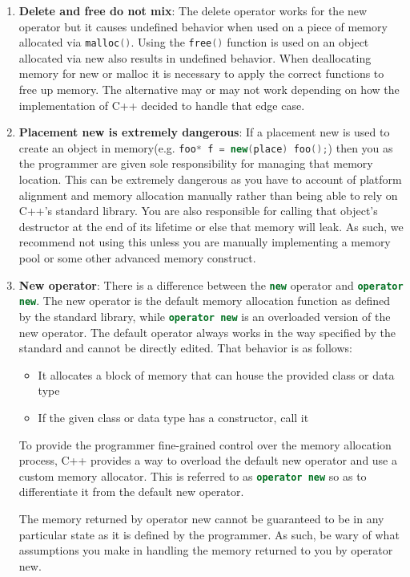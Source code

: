 \documentclass[letterpaper, 11pt]{article}
\newcommand{\inlinecode}[1]{\colorbox{codegrey}{\lstinline[language=C++]{#1}}}
\begin{document}
\begin{enumerate}
  \item {\bfseries Delete and free do not mix}:
  The delete operator works for the new operator but it causes undefined behavior when used 
  on a piece of memory allocated via \inlinecode{malloc()}. Using the \inlinecode{free()} function 
  is used on an object allocated via new also results in undefined behavior. When deallocating memory for 
  new or malloc it is necessary to apply the correct functions to free up memory. The alternative may or may not work
  depending on how the implementation of C++ decided to handle that edge case.
  
  \item {\bfseries Placement new is extremely dangerous}:
  If a placement new is used to create an object in memory(e.g. \inlinecode{foo* f = new(place) foo();}) 
  then you as the programmer are given sole responsibility for managing that memory location. This can
  be extremely dangerous as you have to account of platform alignment and memory allocation manually
  rather than being able to rely on C++'s standard library. You are also responsible for calling that
  object's destructor at the end of its lifetime or else that memory will leak. As such, we recommend 
  not using this unless you are manually implementing a memory pool or some other advanced memory construct.

  \item {\bfseries New operator}:
  There is a difference between the \inlinecode{new} operator and \inlinecode{operator new}. The new operator 
  is the default memory allocation function as defined by the standard library, while \inlinecode{operator new} 
  is an overloaded version of the new operator. The default operator always works in the way specified by
  the standard and cannot be directly edited. That behavior is as follows:
  \begin{itemize}
   \item It allocates a block of memory that can house the provided class or data type
   \item If the given class or data type has a constructor, call it
  \end{itemize}
  To provide the programmer fine-grained control over the memory allocation process, C++
  provides a way to overload the default new operator and use a custom memory allocator. This is referred to
  as \inlinecode{operator new} so as to differentiate it from the default new operator.
  \par\vspace{\baselineskip}
  The memory returned by operator new cannot be guaranteed to be in any particular state as it is 
  defined by the programmer. As such, be wary of what assumptions you make in handling the memory
  returned to you by operator new.


\end{enumerate}
\end{document}
